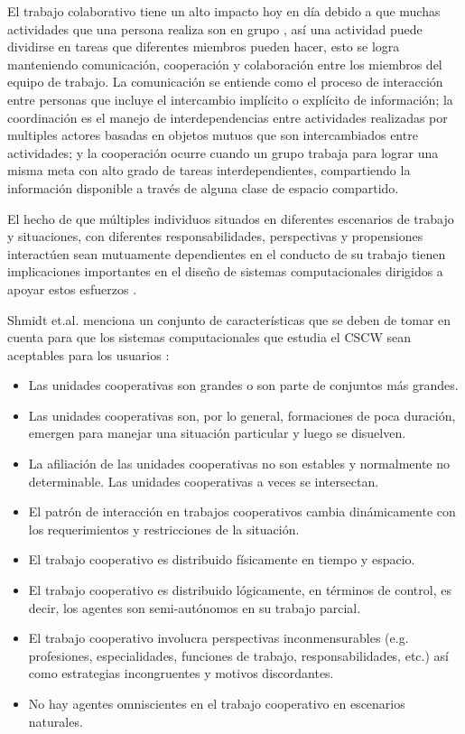 El trabajo colaborativo tiene un alto impacto hoy en d\'ia debido a que muchas actividades que una persona realiza son en grupo \citep{ellis1991groupware}, as\'i una actividad puede dividirse en tareas que diferentes miembros pueden hacer, esto se logra manteniendo comunicaci\'on, cooperaci\'on y colaboraci\'on entre los miembros del equipo de trabajo. La comunicaci\'on se entiende como el proceso de interacci\'on entre personas que incluye el intercambio impl\'icito o expl\'icito de informaci\'on\citep{cruz2012towards}; la coordinaci\'on es el manejo de interdependencias entre actividades realizadas por multiples actores basadas en objetos mutuos que son intercambiados entre actividades\citep{malone1994interdisciplinary}; y la cooperaci\'on ocurre cuando un grupo trabaja para lograr una misma meta  con alto grado de tareas interdependientes, compartiendo la informaci\'on disponible a trav\'es de alguna clase de espacio compartido\citep{malone1994interdisciplinary}. 

El hecho de que m\'ultiples individuos situados en diferentes escenarios de trabajo y situaciones, con diferentes responsabilidades, perspectivas y propensiones interact\'uen sean mutuamente dependientes en el conducto de su trabajo tienen implicaciones importantes en el dise\~no de sistemas computacionales dirigidos a apoyar estos esfuerzos \citep{schmidt1992taking}.

Shmidt et.al. menciona un conjunto de caracter\'isticas que se deben de tomar en cuenta para que los sistemas computacionales que estudia el CSCW sean aceptables para los usuarios \citep{schmidt1992taking}:
\begin{itemize}
\item Las unidades cooperativas son grandes o son parte de conjuntos m\'as grandes.
\item Las unidades cooperativas son, por lo general, formaciones de poca duraci\'on, emergen para manejar una situaci\'on particular y luego se disuelven.
\item La afiliaci\'on de las unidades cooperativas no son estables y normalmente no determinable. Las unidades cooperativas a veces se intersectan.
\item El patr\'on de interacci\'on en trabajos cooperativos cambia din\'amicamente con los requerimientos y restricciones de la situaci\'on.
\item El trabajo cooperativo es distribuido f\'isicamente en tiempo y espacio.
\item El trabajo cooperativo es distribuido l\'ogicamente, en t\'erminos de control, es decir, los agentes son semi-aut\'onomos en su trabajo parcial.
\item El trabajo cooperativo involucra perspectivas inconmensurables (e.g. profesiones, especialidades, funciones de trabajo, responsabilidades, etc.) as\'i como estrategias incongruentes y motivos discordantes.
\item No hay agentes omniscientes en el trabajo cooperativo en escenarios naturales.
\end{itemize}

